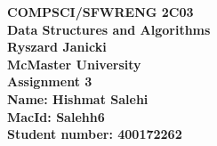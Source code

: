 \documentclass[11pt,fleqn]{article}
\begin{document}
\begin{center}

  {\large \textbf{COMPSCI/SFWRENG 2C03}}\\[2mm]
  {\large \textbf{Data Structures and Algorithms}}\\[2mm]
  {\large \textbf{Ryszard Janicki}}\\[2mm]
  {\large \textbf{McMaster University}}\\[6mm]
  {\huge \textbf{Assignment 3}}\\[6mm]
  {\large \textbf{Name: Hishmat Salehi}}\\[2mm]
  {\large \textbf{MacId: Salehh6}}\\[2mm]
  {\large \textbf{Student number: 400172262}}\\[2mm]


\end{center}

\medskip
\end{document}

